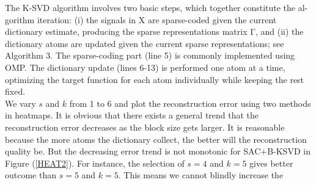 The K-SVD algorithm involves two basic steps, which together constitute the al- gorithm iteration: (i) the signals in X are sparse-coded given the current dictionary estimate, producing the sparse representations matrix Γ, and (ii) the dictionary atoms are updated given the current sparse representations; see Algorithm 3. The sparse-coding part (line 5) is commonly implemented using OMP. The dictionary update (lines 6-13) is performed one atom at a time, optimizing the target function for each atom individually while keeping the rest fixed.\\

We vary $s$ and $k$ from 1 to 6 and plot the reconstruction error using two methods in heatmaps. It is obvious that there exists a general trend that the reconstruction error decreases as the block size gets larger. It is reasonable because the more atoms the dictionary collect, the better will the reconstruction quality be. But the decreasing error trend is not monotonic for SAC+B-KSVD in Figure (\ref{HEAT2}). For instance, the selection of $s=4$ and $k=5$ gives better outcome than $s=5$ and $k=5$. This means we cannot blindly increase the 

